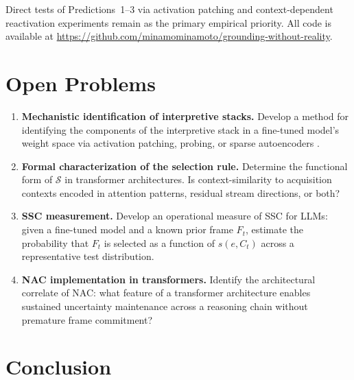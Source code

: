 \documentclass[12pt]{article}
\begin{document}
Direct tests of Predictions~1--3 via activation patching and
context-dependent reactivation experiments remain as the primary
empirical priority.
All code is available at
\url{https://github.com/minamominamoto/grounding-without-reality}.

\section{Open Problems}

\begin{enumerate}[label=\textbf{OP\arabic*.}, leftmargin=*, itemsep=4pt]

\item \textbf{Mechanistic identification of interpretive stacks.}
    Develop a method for identifying the components of the
    interpretive stack in a fine-tuned model's weight space via
    activation patching, probing, or sparse autoencoders
    \cite{bricken2023monosemanticity}.

\item \textbf{Formal characterization of the selection rule.}
    Determine the functional form of $\mathcal{S}$ in transformer
    architectures. Is context-similarity to acquisition contexts
    encoded in attention patterns, residual stream directions, or
    both?

\item \textbf{SSC measurement.}
    Develop an operational measure of SSC for LLMs: given a
    fine-tuned model and a known prior frame $F_t$, estimate the
    probability that $F_t$ is selected as a function of
    $s(e, C_t)$ across a representative test distribution.

\item \textbf{NAC implementation in transformers.}
    Identify the architectural correlate of NAC: what feature
    of a transformer architecture enables sustained uncertainty
    maintenance across a reasoning chain without premature
    frame commitment?

\end{enumerate}

\section{Conclusion}
\end{document}
